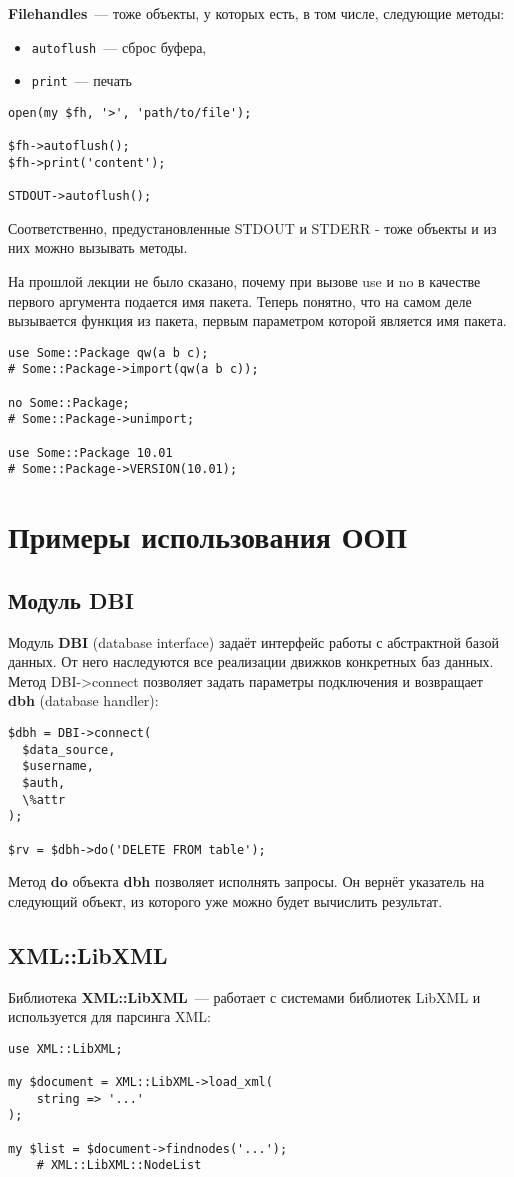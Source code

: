 \textbf{Filehandles}~--- тоже объекты, у которых есть, в том числе, следующие методы:
\begin{itemize}
  \item \verb|autoflush|~--- сброс буфера,
  \item \verb|print|~--- печать
\end{itemize}

\begin{verbatim}
open(my $fh, '>', 'path/to/file');

$fh->autoflush();
$fh->print('content');

STDOUT->autoflush();
\end{verbatim}
Соответственно, предустановленные STDOUT и STDERR - тоже объекты и из них можно вызывать методы.

На прошлой лекции не было сказано, почему при вызове use и no в качестве первого аргумента подается имя пакета. Теперь понятно, что на самом деле вызывается функция из пакета, первым параметром которой является имя пакета.
\begin{verbatim}
use Some::Package qw(a b c);
# Some::Package->import(qw(a b c));

no Some::Package;
# Some::Package->unimport;

use Some::Package 10.01
# Some::Package->VERSION(10.01);
\end{verbatim}

\section{Примеры использования ООП}%
\subsection{Модуль DBI}
Модуль \textbf{DBI} (database interface) задаёт интерфейс работы с абстрактной базой данных. От него наследуются все реализации движков конкретных баз данных. Метод DBI->connect позволяет задать параметры подключения и возвращает  \textbf{dbh} (database handler):
\begin{verbatim}
$dbh = DBI->connect(
  $data_source,
  $username,
  $auth,
  \%attr
);

$rv = $dbh->do('DELETE FROM table');
\end{verbatim}
Метод \textbf{do} объекта \textbf{dbh} позволяет исполнять запросы. Он вернёт указатель на следующий объект, из которого уже можно будет вычислить результат.


\subsection{XML::LibXML}%
Библиотека \textbf{XML::LibXML}~--- работает с системами библиотек LibXML и используется для парсинга XML:
\begin{verbatim}
use XML::LibXML;

my $document = XML::LibXML->load_xml(
    string => '...'
);

my $list = $document->findnodes('...');
    # XML::LibXML::NodeList
\end{verbatim}

